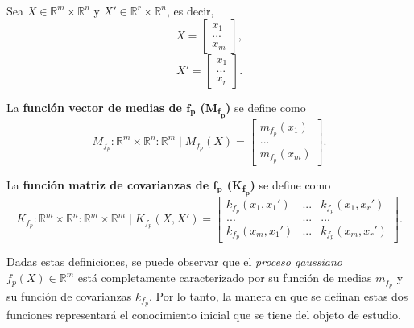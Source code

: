 \begin{defin*}
Sea $X \in \mathbb{R}^m \times \mathbb{R}^n$ y $X' \in \mathbb{R}^r \times \mathbb{R}^n$, es decir,
\begin{equation*}
    X =     
    \left[
        \begin{array}{c}
        x_1  \\
        ... \\
        x_m
        \end{array}
    \right],
\end{equation*}
\begin{equation*}
    X' =     
    \left[
        \begin{array}{c}
        x_1  \\
        ... \\
        x_r
        \end{array}
    \right].
\end{equation*}

La \textbf{función vector de medias de $\bm{f_p}$ (M\textsubscript{$\bm{f_p}$})} se define como
\begin{equation*}
    M_{f_p}: \mathbb{R}^m \times \mathbb{R}^n: \mathbb{R}^m
    \mid
    M_{f_p}(X) =     
    \left[
        \begin{array}{c}
        m_{f_p}(x_1)  \\
        ... \\
        m_{f_p}(x_m)
        \end{array}
    \right].
\end{equation*}

La \textbf{función matriz de covarianzas de $\bm{f_p}$ (K\textsubscript{$\bm{f_p}$})} se define como
\begin{equation*}
    K_{f_p}: \mathbb{R}^m \times \mathbb{R}^n: \mathbb{R}^m \times \mathbb{R}^m
    \mid
    K_{f_p}(X,X') =     
    \left[
        \begin{array}{ccc}
        k_{f_p}(x_1,x_1') & ... & k_{f_p}(x_1,x_r')  \\
        ... & ... & ... \\
        k_{f_p}(x_m,x_1') & ... & k_{f_p}(x_m,x_r')
        \end{array}
    \right].
\end{equation*}
\end{defin*}

Dadas estas definiciones, se puede observar que el \textit{proceso gaussiano} $f_p(X) \in \mathbb{R}^m$ está completamente caracterizado por su función de medias $m_{f_p}$ y su función de covarianzas $k_{f_p}$. Por lo tanto, la manera en que se definan estas dos funciones representar\'a el conocimiento inicial que se tiene del objeto de estudio. 

